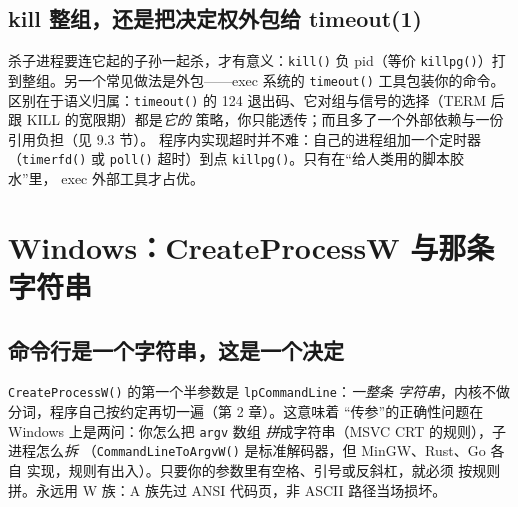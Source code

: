 \documentclass[12pt,a4paper,fontset=fandol]{ctexbook}
\newcommand{\Fn}[1]{\texttt{#1()}}
\newcommand{\Tp}[1]{\texttt{#1}}
\begin{document}
\subsection{kill 整组，还是把决定权外包给 timeout(1)}

杀子进程要连它起的子孙一起杀，才有意义：\Fn{kill} 负 pid（等价
\Fn{killpg}）打到整组。另一个常见做法是外包——exec 系统的
\Fn{timeout} 工具包装你的命令。区别在于语义归属：\Fn{timeout} 的 124
退出码、它对组与信号的选择（TERM 后跟 KILL 的宽限期）都是\emph{它的}
策略，你只能透传；而且多了一个外部依赖与一份引用负担（见 9.3 节）。
程序内实现超时并不难：自己的进程组加一个定时器（\Fn{timerfd} 或
\Fn{poll} 超时）到点 \Fn{killpg}。只有在``给人类用的脚本胶水''里，
exec 外部工具才占优。

\section{Windows：CreateProcessW 与那条字符串}

\subsection{命令行是一个字符串，这是一个决定}

\Fn{CreateProcessW} 的第一个半参数是 \Tp{lpCommandLine}：\emph{一整条
字符串}，内核不做分词，程序自己按约定再切一遍（第 2 章）。这意味着
``传参''的正确性问题在 Windows 上是两问：你怎么把 \Tp{argv} 数组
\emph{拼}成字符串（MSVC CRT 的规则），子进程怎么\emph{拆}
（\Fn{CommandLineToArgvW} 是标准解码器，但 MinGW、Rust、Go 各自
实现，规则有出入）。只要你的参数里有空格、引号或反斜杠，就必须
按规则拼。永远用 W 族：A 族先过 ANSI 代码页，非 ASCII 路径当场损坏。
\end{document}
